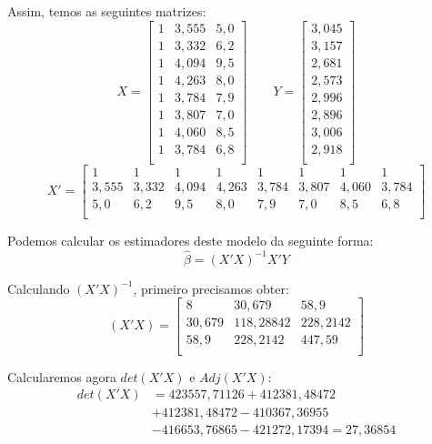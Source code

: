 \documentclass[]{ufpe-exercises}
\begin{document}
\begin{questions}
\begin{parts}
\begin{solution}
			\vspace{0.2cm}

			Assim, temos as seguintes matrizes:
			\[
				X =
				\begin{bmatrix}
					1 & 3,555 & 5,0 \\
					1 & 3,332 & 6,2 \\
					1 & 4,094 & 9,5 \\
					1 & 4,263 & 8,0 \\
					1 & 3,784 & 7,9 \\
					1 & 3,807 & 7,0 \\
					1 & 4,060 & 8,5 \\
					1 & 3,784 & 6,8 \\
				\end{bmatrix} \qquad
				Y =
				\begin{bmatrix}
					3,045 \\
					3,157 \\
					2,681 \\
					2,573 \\
					2,996 \\
					2,896 \\
					3,006 \\
					2,918 \\
				\end{bmatrix}
			\]
			\[
				X' =
				\begin{bmatrix}
					1     & 1     & 1     & 1     & 1     & 1     & 1     & 1     \\
					3,555 & 3,332 & 4,094 & 4,263 & 3,784 & 3,807 & 4,060 & 3,784 \\
					5,0   & 6,2   & 9,5   & 8,0   & 7,9   & 7,0   & 8,5   & 6,8   \\
				\end{bmatrix}
			\]

			Podemos calcular os estimadores deste modelo da seguinte forma:
			\[\hat{\beta} = (X'X)^{-1}X'Y\]

			Calculando \((X'X)^{-1}\), primeiro precisamos obter:
			\[
				(X'X) =
				\begin{bmatrix}
					8      & 30,679    & 58,9     \\
					30,679 & 118,28842 & 228,2142 \\
					58,9   & 228,2142  & 447,59   \\
				\end{bmatrix}
			\]

			Calcularemos agora \(det(X'X)\) e \(Adj(X'X)\):
			\begin{align*}
				det(X'X) & = 423557,71126 + 412381,48472            \\
				         & + 412381,48472 - 410367,36955            \\
				         & - 416653,76865 - 421272,17394 = 27,36854
			\end{align*}


\end{solution}
\end{parts}
\end{questions}
\end{document}
